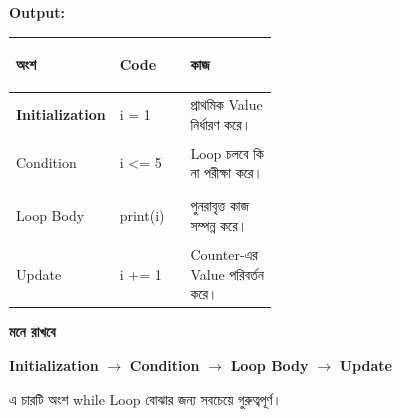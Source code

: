 \textbf{Output:}

\begin{center}
\textenglish{    }
\end{center}



\begin{tabularx}
{\linewidth}
{
|>{\bfseries\RaggedRight\arraybackslash}p{0.25\linewidth}
|>{\RaggedRight\arraybackslash}p{0.27\linewidth}
|Y|
}

\hline
{}

\textbf{অংশ}
&
\textbf{Code}
&
\textbf{কাজ}
\\
\hline

Initialization
&
\textenglish{\ttfamily i = 1}
&
প্রাথমিক Value নির্ধারণ করে।
\\
\hline

Condition
&
\textenglish{\ttfamily i <= 5}
&
Loop চলবে কি না পরীক্ষা করে।
\\
\hline

Loop Body
&
\textenglish{\ttfamily print(i)}
&
পুনরাবৃত্ত কাজ সম্পন্ন করে।
\\
\hline

Update
&
\textenglish{\ttfamily i += 1}
&
Counter-এর Value পরিবর্তন করে।
\\
\hline

\end{tabularx}

\begin{rememberbox}

\textbf{\color{deepOrange}মনে রাখবে}

\begin{center}

\textbf{Initialization}
\(\longrightarrow\)
\textbf{Condition}
\(\longrightarrow\)
\textbf{Loop Body}
\(\longrightarrow\)
\textbf{Update}

\end{center}

এ চারটি অংশ
\textenglish{\ttfamily while}
Loop বোঝার জন্য সবচেয়ে গুরুত্বপূর্ণ।

\end{rememberbox}


